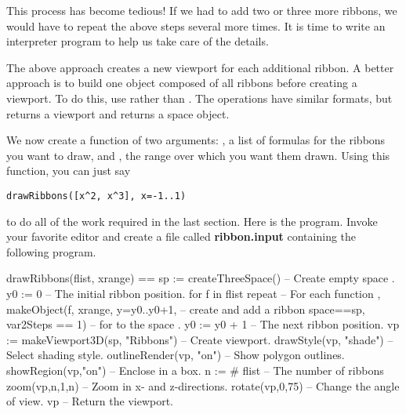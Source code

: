 This process has become tedious!
If we had to add two or three more ribbons, we would have to
repeat the above steps several more times.
It is time to write an interpreter program to help us take care of
the details.

%

The above approach creates a new viewport for each additional
ribbon.
A better approach is to build one object composed of all ribbons
before creating a viewport.
To do this, use  rather than .
The operations have similar formats, but
 returns a viewport and
 returns a space object.

We now create a function  of two arguments:
, a list of formulas for the ribbons you want to draw,
and , the range over which you want them drawn.
Using this function, you can just say
\begin{verbatim}
drawRibbons([x^2, x^3], x=-1..1)
\end{verbatim}
to do all of the work required in the last section.
Here is the  program.
Invoke your favorite editor and create a file called {\bf ribbon.input}
containing the following program.

\begin{figXmpLines}[caption={The first \protect\pspadfun{drawRibbons} function.}]
drawRibbons(flist, xrange) ==
  sp := createThreeSpace()               -- Create empty space .
  y0 := 0                                -- The initial ribbon position.
  for f in flist repeat                  -- For each function ,
    makeObject(f, xrange, y=y0..y0+1,    -- \quad{}create and add a ribbon
       space==sp, var2Steps == 1)        -- \quad{}for  to the space .
    y0 := y0 + 1                         -- The next ribbon position.
  vp := makeViewport3D(sp, "Ribbons")    -- Create viewport.
  drawStyle(vp, "shade")                 -- Select shading style.
  outlineRender(vp, "on")                -- Show polygon outlines.
  showRegion(vp,"on")                    -- Enclose in a box.
  n := # flist                           -- The number of ribbons
  zoom(vp,n,1,n)                         -- Zoom in x- and z-directions.
  rotate(vp,0,75)                        -- Change the angle of view.
  vp                                     -- Return the viewport.
\end{figXmpLines}

